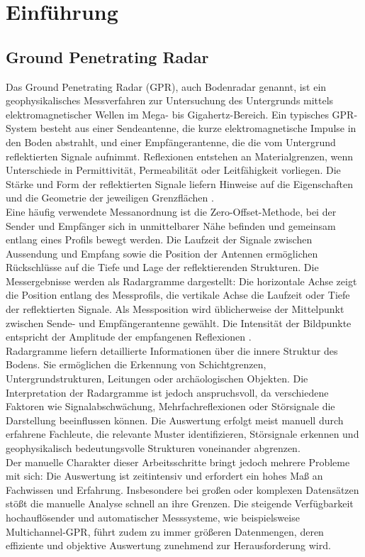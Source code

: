 \section{Einführung}

\subsection{Ground Penetrating Radar}

Das Ground Penetrating Radar (GPR), auch Bodenradar genannt, ist ein geophysikalisches Messverfahren zur Untersuchung des Untergrunds mittels elektromagnetischer Wellen im Mega- bis Gigahertz-Bereich. Ein typisches GPR-System besteht aus einer Sendeantenne, die kurze elektromagnetische Impulse in den Boden abstrahlt, und einer Empfängerantenne, die die vom Untergrund reflektierten Signale aufnimmt. Reflexionen entstehen an Materialgrenzen, wenn Unterschiede in Permittivität, Permeabilität oder Leitfähigkeit vorliegen. Die Stärke und Form der reflektierten Signale liefern Hinweise auf die Eigenschaften und die Geometrie der jeweiligen Grenzflächen \parencite{annan_ground_2003}. \\
Eine häufig verwendete Messanordnung ist die Zero-Offset-Methode, bei der Sender und Empfänger sich in unmittelbarer Nähe befinden und gemeinsam entlang eines Profils bewegt werden. Die Laufzeit der Signale zwischen Aussendung und Empfang sowie die Position der Antennen ermöglichen Rückschlüsse auf die Tiefe und Lage der reflektierenden Strukturen. Die Messergebnisse werden als Radargramme dargestellt: Die horizontale Achse zeigt die Position entlang des Messprofils, die vertikale Achse die Laufzeit oder Tiefe der reflektierten Signale. Als Messposition wird üblicherweise der Mittelpunkt zwischen Sende- und Empfängerantenne gewählt. Die Intensität der Bildpunkte entspricht der Amplitude der empfangenen Reflexionen \parencite{annan_ground_2003}. \\
Radargramme liefern detaillierte Informationen über die innere Struktur des Bodens. Sie ermöglichen die Erkennung von Schichtgrenzen, Untergrundstrukturen, Leitungen oder archäologischen Objekten. Die Interpretation der Radargramme ist jedoch anspruchsvoll, da verschiedene Faktoren wie Signalabschwächung, Mehrfachreflexionen oder Störsignale die Darstellung beeinflussen können. Die Auswertung erfolgt meist manuell durch erfahrene Fachleute, die relevante Muster identifizieren, Störsignale erkennen und geophysikalisch bedeutungsvolle Strukturen voneinander abgrenzen. \\
Der manuelle Charakter dieser Arbeitsschritte bringt jedoch mehrere Probleme mit sich: Die Auswertung ist zeitintensiv und erfordert ein hohes Maß an Fachwissen und Erfahrung. Insbesondere bei großen oder komplexen Datensätzen stößt die manuelle Analyse schnell an ihre Grenzen. Die steigende Verfügbarkeit hochauflösender und automatischer Messsysteme, wie beispielsweise Multichannel-GPR, führt zudem zu immer größeren Datenmengen, deren effiziente und objektive Auswertung zunehmend zur Herausforderung wird.

